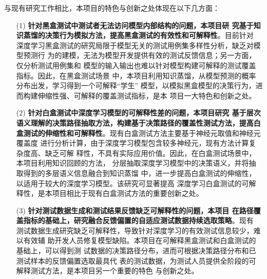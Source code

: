 与现有研究工作相比，本项目的特色与创新之处体现在以下几方面：

\begin{itemize}
    \item[(1)] \textbf{针对黑盒测试中测试者无法访问模型内部结构的问题，本项目研
    究基于知识蒸馏的决策行为模拟方法，提高黑盒测试的有效性和可解释性}。目前针对
    深度学习黑盒测试的研究局限于模型无关的测试用例集多样性分析，缺乏对模型预测行
    为的建模，无法为模型开发提供有效的测试反馈信息；另一方面，仅分析测试用例集和
    模型的输入输出也难以针对模型构建可解释的测试覆盖指标。因此，在黑盒测试场景
    中，本项目利用知识蒸馏，从模型预测的概率分布出发，学习得到一个可解释``学生''
    模型，以模拟黑盒模型的决策行为，进而构建伸缩性强、可解释的覆盖测试指标，是本
    项目一大特色和创新之处。
    \item[(2)] \textbf{针对白盒测试中深度学习模型的可解释性差的问题，本项目研究
    基于层次语义理解的决策路径抽取方法，构建基于决策路径的覆盖性测试方法，提高白
    盒测试的伸缩性和可解释性}。现有白盒测试方法主要基于神经元取值和神经元覆盖度
    进行分析计算，由于深度学习模型包含较多神经元，现有方法计算复杂度高、缺乏可解
    释性，不具有实际应用价值。因此，在白盒测试场景中，本项目利用知识回顾的方法，
    分层抽取深度学习模型中的决策语义，并将抽取得到的多层语义信息融合到知识蒸馏
    中，进一步提高白盒测试的伸缩性，以适用于较大的深度学习模型。该研究可显著提高
    深度学习白盒测试的可解释性，是本项目相比于现有白盒测试方法的重要创新之处。
    \item[(3)] \textbf{针对测试数据生成和测试结果反馈缺乏可解释性的问题，本项目
    在路径覆盖指标的基础上，研究融合反馈偏置的自适应测试数据持续选取策略}。现有
    测试数据生成研究缺乏可解释性，导致针对深度学习的有效测试信息较少，难以有效辅
    助开发人员修复模型缺陷。本项目在可解释黑盒测试和白盒测试的基础上，可以得到测
    试数据的决策路径分布，进而可根据决策路径分布和已测试样本的反馈偏置选取最具代
    表的测试数据，为测试人员提供全阶段的可解释测试方法，是本项目另一个重要的特色
    与创新之处。
\end{itemize}